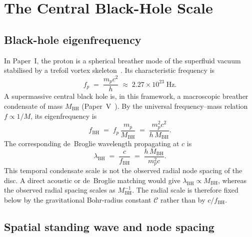 \documentclass[11pt,a4paper]{article}
\begin{document}
\section{The Central Black-Hole Scale}
\label{sec:bh_scale}

\subsection{Black-hole eigenfrequency}

In Paper~I, the proton is a spherical breather mode of the superfluid vacuum stabilised by a
trefoil vortex skeleton~\cite{SSV-I}.  Its characteristic frequency is
\begin{equation}
  f_p \;=\; \frac{m_p c^2}{h} \;\approx\; 2.27\times10^{23}\;\mathrm{Hz}.
  \label{eq:fp}
\end{equation}
A supermassive central black hole is, in this framework, a macroscopic breather condensate of
mass $M_\mathrm{BH}$ (Paper~V~\cite{SSV-V}).  By the universal frequency--mass relation
$f \propto 1/M$, its eigenfrequency is
\begin{equation}
  \boxed{f_\mathrm{BH} \;=\; f_p\,\frac{m_p}{M_\mathrm{BH}}
      \;=\; \frac{m_p^2 c^2}{h\,M_\mathrm{BH}}.}
  \label{eq:fBH}
\end{equation}
The corresponding de~Broglie wavelength propagating at $c$ is
\begin{equation}
  \lambda_\mathrm{BH} \;=\; \frac{c}{f_\mathrm{BH}}
      \;=\; \frac{h\,M_\mathrm{BH}}{m_p^2 c}.
  \label{eq:lambda_BH}
\end{equation}
This temporal condensate scale is not the observed radial node spacing of the
disc.  A direct acoustic or de~Broglie matching would give
$\lambda_\mathrm{BH}\propto M_\mathrm{BH}$, whereas the observed radial spacing
scales as $M_\mathrm{BH}^{-1}$.  The radial scale is therefore fixed below by
the gravitational Bohr-radius constant $\mathcal C$ rather than by
$c/f_\mathrm{BH}$.

\subsection{Spatial standing wave and node spacing}
\end{document}
